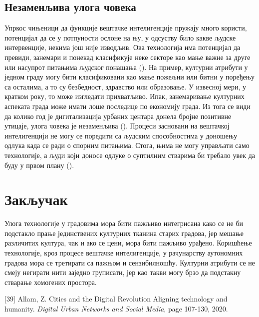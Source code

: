 \documentclass{article}
\begin{document}
\subsection{Незаменљива улога човека}
Упркос чињеници да функције вештачке интелигенције пружају много користи, потенцијал да се у потпуности ослоне на њу, у одсуству било какве људске интервенције, некима још није изводљив. Ова технологија има потенцијал да превиди, занемари и понекад класификује неке секторе као мање важне за друге или насупрот питањима људског понашања (\cite{dubey}). На пример, културни атрибути у једном граду могу бити класификовани као мање пожељни или битни у поређењу са осталима, а то су безбедност, здравство или образовање. У извесној мери, у кратком року, то може изгледати прихватљиво. Ипак, занемаривање културних аспеката града може имати лоше последице по економију града. Из тога се види да колико год је дигитализација урбаних центара донела бројне позитивне утицаје, улога човека је незаменљива (\cite{zorins}). Процеси засновани на вештачкој интелигенцији не могу се поредити са људским способностима у доношењу одлука када се ради о спорним питањима. Стога, њима не могу управљати само технологије, а људи који доносе одлуке о суптилним стварима би требало увек да буду у првом плану (\cite{heh}).

\section{Закључак}

Улога технологије у градовима мора бити пажљиво интегрисана како се не би подстакло прање јединствених културних тканина старих градова, јер мешање различитих култура, чак и ако се цени, мора бити пажљиво урађено. Коришћење технологије, кроз процесе вештачке интелигенције, у рачунарству аутономних градова мора се третирати са пажњом и сензибилношћу. Културни атрибути се не смеју негирати нити заједно груписати, јер као такви могу брзо да подстакну стварање хомогених простора. 

\newpage

 

\vspace{-7}
\bibitem{} [39] \space Allam, Z. Cities and the  Digital  Revolution Aligning technology and humanity. \emph{Digital Urban Networks and Social Media}, page 107-130, 2020.
\end{document}
